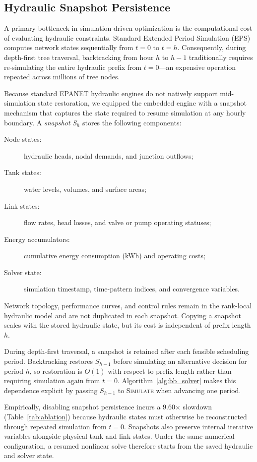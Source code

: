 \documentclass[Journal,letterpaper,InsideFigs]{ascelike-new}
\begin{document}
\subsection{Hydraulic Snapshot Persistence}

A primary bottleneck in simulation-driven optimization is the computational cost of evaluating hydraulic constraints. Standard Extended Period Simulation (EPS) computes network states sequentially from $t=0$ to $t=h$. Consequently, during depth-first tree traversal, backtracking from hour $h$ to $h-1$ traditionally requires re-simulating the entire hydraulic prefix from $t=0$---an expensive operation repeated across millions of tree nodes.

Because standard EPANET hydraulic engines do not natively support mid-simulation state restoration, we equipped the embedded engine with a snapshot mechanism that captures the state required to resume simulation at any hourly boundary. A \emph{snapshot} $S_h$ stores the following components:
\begin{description}
	\item[Node states:] hydraulic heads, nodal demands, and junction outflows;
	\item[Tank states:] water levels, volumes, and surface areas;
	\item[Link states:] flow rates, head losses, and valve or pump operating statuses;
	\item[Energy accumulators:] cumulative energy consumption (kWh) and operating costs;
	\item[Solver state:] simulation timestamp, time-pattern indices, and convergence variables.
\end{description}
Network topology, performance curves, and control rules remain in the rank-local hydraulic model and are not duplicated in each snapshot. Copying a snapshot scales with the stored hydraulic state, but its cost is independent of prefix length $h$.

During depth-first traversal, a snapshot is retained after each feasible scheduling period. Backtracking restores $S_{h-1}$ before simulating an alternative decision for period $h$, so restoration is $O(1)$ with respect to prefix length rather than requiring simulation again from $t=0$. Algorithm~\ref{alg:bb_solver} makes this dependence explicit by passing $S_{h-1}$ to \textsc{Simulate} when advancing one period.

Empirically, disabling snapshot persistence incurs a 9.60$\times$ slowdown (Table~\ref{tab:ablation}) because hydraulic states must otherwise be reconstructed through repeated simulation from $t=0$. Snapshots also preserve internal iterative variables alongside physical tank and link states. Under the same numerical configuration, a resumed nonlinear solve therefore starts from the saved hydraulic and solver state.
\end{document}
